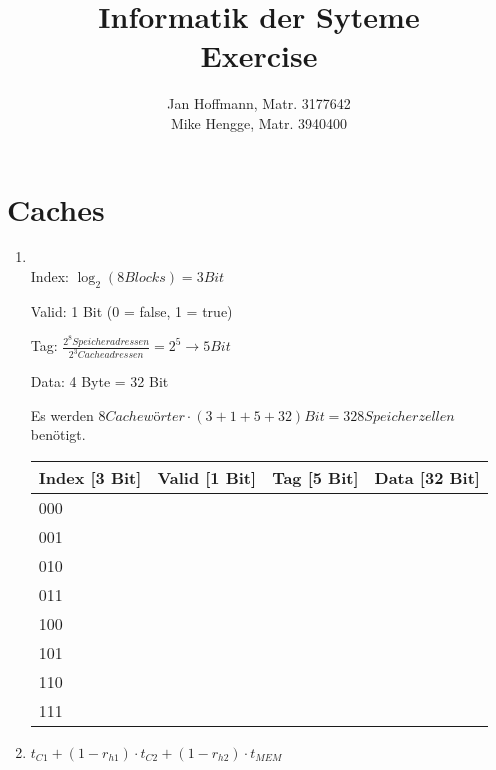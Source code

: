 \documentclass[10pt,a4paper]{article}
\title{Informatik der Syteme \\ Exercise \exnum}
\author{Jan Hoffmann, Matr. 3177642 \\ Mike Hengge,  Matr. 3940400}
\begin{document}
\section{Caches}\label{sec:11.1}
	\begin{enumerate}
		\item \text{}\\
			Index: $\log_2(8 Blocks) = 3 Bit$
			
			Valid: 1 Bit (0 = false, 1 = true)
			
			Tag: $\frac{2^{8} Speicheradressen}{2^3 Cacheadressen} = 2^5 \rightarrow 5 Bit$
			
			Data: 4 Byte = 32 Bit
			
			Es werden $8 Cachewörter \cdot (3+1+5+32)Bit = 328 Speicherzellen$ benötigt.
			
			
			\begin{tabular}{|l|l|l|l|}
				\hline
				Index [3 Bit]	&	Valid [1 Bit] & Tag [5 Bit] & Data [32 Bit] \hspace{3cm} \\ \hline
				000 & & & \\ \hline
				001 & & & \\ \hline
				010 & & & \\ \hline
				011 & & & \\ \hline
				100 & & & \\ \hline
				101 & & & \\ \hline
				110 & & & \\ \hline
				111 & & & \\ \hline
			\end{tabular}
		\item $t_{C1} + (1-r_{h1}) \cdot t_{C2} + (1-r_{h2}) \cdot t_{MEM}$
	\end{enumerate}
\end{document}
